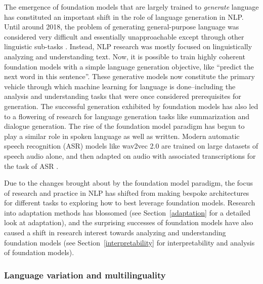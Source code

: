 The emergence of foundation models that are largely trained to \textit{generate} language has constituted an important shift in the role of language generation in NLP\@. 
Until around 2018, the problem of generating general-purpose language was considered very difficult and essentially unapproachable except through other linguistic sub-tasks \citep{paris2013natural}. Instead,  NLP research was mostly focused on linguistically analyzing and understanding text. Now, it is possible to train highly coherent foundation models with a simple language generation objective, like ``predict the next word in this sentence''. These generative models now constitute the primary vehicle through which machine learning for language is done--including the analysis and understanding tasks that were once considered prerequisites for generation. The successful generation exhibited by foundation models has also led to a flowering of research for language generation tasks like summarization and dialogue generation. The rise of the foundation model paradigm has begun to play a similar role in spoken language as well as written.  Modern automatic speech recognition (ASR) models like wav2vec 2.0 are trained on large datasets of speech audio alone, and then adapted on audio with associated transcriptions for the task of ASR \citep{wav2vec2}.

Due to the changes brought about by the foundation model paradigm, the focus of research and practice in NLP has shifted from making bespoke architectures for different tasks to exploring how to best leverage foundation models. Research into adaptation methods has blossomed (see Section~\ref{adaptation} for a detailed look at adaptation), and the surprising successes of foundation models have also caused a shift in research interest towards analyzing and understanding foundation models (see Section~\ref{interpretability} for interpretability and analysis of foundation models).

\subsubsection{Language variation and multilinguality}

